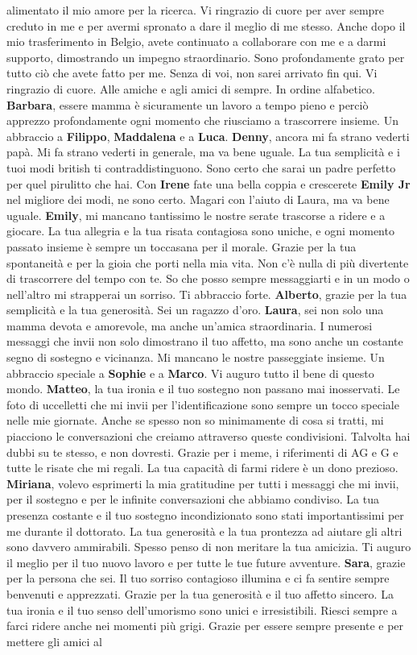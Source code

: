 \documentclass[10pt, twoside]{book} %
\begin{document}
alimentato il mio amore per la ricerca. Vi ringrazio di cuore per aver sempre creduto in me e per avermi spronato a dare il meglio di me stesso. Anche dopo il mio trasferimento in Belgio, avete continuato a collaborare con me e a darmi supporto, dimostrando un impegno straordinario. Sono profondamente grato per tutto ciò che avete fatto per me. Senza di voi, non sarei arrivato fin qui. Vi ringrazio di cuore. Alle amiche e agli amici di sempre. In ordine alfabetico. \textbf{Barbara}, essere mamma è sicuramente un lavoro a tempo pieno e perciò apprezzo profondamente ogni momento che riusciamo a trascorrere insieme. Un abbraccio a \textbf{Filippo}, \textbf{Maddalena} e a \textbf{Luca}. \textbf{Denny}, ancora mi fa strano vederti papà. Mi fa strano vederti in generale, ma va bene uguale. La tua semplicità e i tuoi modi british ti contraddistinguono. Sono certo che sarai un padre perfetto per quel pirulitto che hai. Con \textbf{Irene} fate una bella coppia e crescerete \textbf{Emily Jr} nel migliore dei modi, ne sono certo. Magari con l’aiuto di Laura, ma va bene uguale. \textbf{Emily}, mi mancano tantissimo le nostre serate trascorse a ridere e a giocare. La tua allegria e la tua risata contagiosa sono uniche, e ogni momento passato insieme è sempre un toccasana per il morale. Grazie per la tua spontaneità e per la gioia che porti nella mia vita. Non c'è nulla di più divertente di trascorrere del tempo con te. So che posso sempre messaggiarti e in un modo o nell’altro mi strapperai un sorriso. Ti abbraccio forte. \textbf{Alberto}, grazie per la tua semplicità e la tua generosità. Sei un ragazzo d’oro.  \textbf{Laura}, sei non solo una mamma devota e amorevole, ma anche un'amica straordinaria. I numerosi messaggi che invii non solo dimostrano il tuo affetto, ma sono anche un costante segno di sostegno e vicinanza. Mi mancano le nostre passeggiate insieme. Un abbraccio speciale a \textbf{Sophie} e a \textbf{Marco}. Vi auguro tutto il bene di questo mondo. \textbf{Matteo}, la tua ironia e il tuo sostegno non passano mai inosservati. Le foto di uccelletti che mi invii per l'identificazione sono sempre un tocco speciale nelle mie giornate. Anche se spesso non so minimamente di cosa si tratti, mi piacciono le conversazioni che creiamo attraverso queste condivisioni. Talvolta hai dubbi su te stesso, e non dovresti. Grazie per i meme, i riferimenti di AG e G e tutte le risate che mi regali. La tua capacità di farmi ridere è un dono prezioso. \textbf{Miriana}, volevo esprimerti la mia gratitudine per tutti i messaggi che mi invii, per il sostegno e per le infinite conversazioni che abbiamo condiviso. La tua presenza costante e il tuo sostegno incondizionato sono stati importantissimi per me durante il dottorato. La tua generosità e la tua prontezza ad aiutare gli altri sono davvero ammirabili. Spesso penso di non meritare la tua amicizia. Ti auguro il meglio per il tuo nuovo lavoro e per tutte le tue future avventure. \textbf{Sara}, grazie per la persona che sei. Il tuo sorriso contagioso illumina e ci fa sentire sempre benvenuti e apprezzati. Grazie per la tua generosità e il tuo affetto sincero. La tua ironia e il tuo senso dell'umorismo sono unici e irresistibili. Riesci sempre a farci ridere anche nei momenti più grigi. Grazie per essere sempre presente e per mettere gli amici al 
\end{document}
